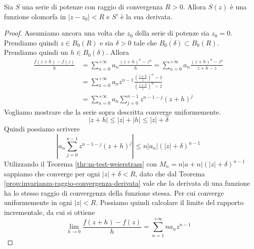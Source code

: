 \begin{theorem}
	\label{thr:teorema-di-abel}
	Sia $S$ una serie di potenze con raggio di convergenza $R > 0$. Allora $S(z)$ è una funzione olomorfa in $|z-z_0| < R$ e $S'$ è la sua derivata.
\end{theorem}
\begin{proof}
	Assumiamo ancora una volta che $z_0$ della serie di potenze sia $z_0 = 0$. Prendiamo quindi $z \in B_0(R)$ e sia $\delta > 0$ tale che $\overline{B_0(\delta)} \subset B_0(R)$. Prendiamo quindi un $h \in B_0(\delta)$. Allora
	\begin{equation*}
	\begin{aligned}
		\frac{f(z+h) - f(z)}{h} & = \sum^{+\infty}_{n=0} a_n \frac{(z+h)^n - z^n}{h} = \sum^{+\infty}_{n=0} a_n \frac{(z+h)^n-z^n}{z+h-z} \\
								& = \sum^{+\infty}_{n=0} a_n z^{n-1} \frac{\left(\frac{z+h}{z}\right)^n - 1}{\left(\frac{z+h}{z}\right)^n - 1} \\
								& = \sum^{+\infty}_{n=0} a_n \sum^{n-1}_{j=0} z^{n-1-j}(z+h)^j 
	\end{aligned}
	\end{equation*}
	Vogliamo mostrare che la serie sopra descritta converge uniformemente.
	\begin{equation*}
		|z+h| \le |z| + |h| \le |z| + \delta
	\end{equation*}
	Quindi possiamo scrivere 
	\begin{equation*}
		\left|a_n \sum^{n-1}_{j=0} z^{n-1-j}(z+h)^j \right| \le n|a_n|(|z|+\delta)^{n-1} 
	\end{equation*}
	Utilizzando il Teorema \ref{thr:m-test-weierstrass} con $M_n = n|a+n|(|z|+\delta)^{n-1}$ sappiamo che converge per ogni $|z|+\delta < R$, dato che dal Teorema \ref{prop:invarianza-raggio-convergenza-derivata} vale che la derivata di una funzione ha lo stesso raggio di convergenza della funzione stessa. Per cui converge uniformemente in ogni $|z| < R$. 
	Possiamo quindi calcolare il limite del rapporto incrementale, da cui si ottiene 
	\begin{equation*}
		\lim_{h\to 0} \frac{f(z+h) - f(z)}{h} = \sum^{+\infty}_{n=1} na_nz^{n-1}
	\end{equation*}
\end{proof}

